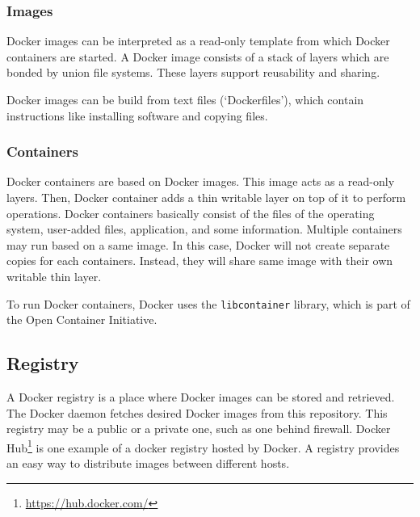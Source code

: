 \subsubsection{Images}
Docker images can be interpreted as a read-only template from which Docker containers are
started. A Docker image consists of a stack of layers which are bonded by union
file systems. These layers support reusability and sharing.

Docker images can be build from text files (`Dockerfiles'), which contain instructions like installing software and copying files.

\subsubsection{Containers}
Docker containers are based on Docker images. This image acts as a read-only
layers. Then, Docker container adds a thin writable layer on top of it to
perform operations. Docker containers basically consist of the files of the operating system,
user-added files, application, and some information. Multiple containers may run
based on a same image. In this case, Docker will not create separate copies for
each containers. Instead, they will share same image with their own writable
thin layer.

To run Docker containers, Docker uses the \verb|libcontainer| library, which is part of the Open Container Initiative.

\subsection{Registry}
A Docker registry is a place where Docker images can be stored and retrieved. The Docker daemon
fetches desired Docker images from this repository. This registry may be a
public or a private one, such as one behind firewall. Docker
Hub\footnote{\url{https://hub.docker.com/}} is one example of a docker registry
hosted by Docker. A registry provides an easy way to distribute images between different hosts.
